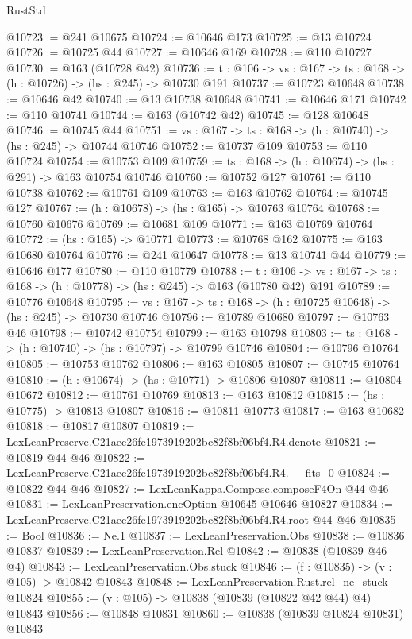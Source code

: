\begin{lexlean}{RustStd}
\begin{coremodule}
@10723 := @241 @10675
@10724 := @10646 @173
@10725 := @13 @10724
@10726 := @10725 @44
@10727 := @10646 @169
@10728 := @110 @10727
@10730 := @163 (@10728 @42)
@10736 := {t : @106} -> {vs : @167} -> {ts : @168} -> (h : @10726) -> (hs : @245) -> @10730 @191
@10737 := @10723 @10648
@10738 := @10646 @42
@10740 := @13 @10738 @10648
@10741 := @10646 @171
@10742 := @110 @10741
@10744 := @163 (@10742 @42)
@10745 := @128 @10648
@10746 := @10745 @44
@10751 := {vs : @167} -> {ts : @168} -> (h : @10740) -> (hs : @245) -> @10744 @10746
@10752 := @10737 @109
@10753 := @110 @10724
@10754 := @10753 @109
@10759 := {ts : @168} -> (h : @10674) -> (hs : @291) -> @163 @10754 @10746
@10760 := @10752 @127
@10761 := @110 @10738
@10762 := @10761 @109
@10763 := @163 @10762
@10764 := @10745 @127
@10767 := (h : @10678) -> (hs : @165) -> @10763 @10764
@10768 := @10760 @10676
@10769 := @10681 @109
@10771 := @163 @10769 @10764
@10772 := (hs : @165) -> @10771
@10773 := @10768 @162
@10775 := @163 @10680 @10764
@10776 := @241 @10647
@10778 := @13 @10741 @44
@10779 := @10646 @177
@10780 := @110 @10779
@10788 := {t : @106} ->
  {vs : @167} -> {ts : @168} -> (h : @10778) -> (hs : @245) -> @163 (@10780 @42) @191
@10789 := @10776 @10648
@10795 := {vs : @167} -> {ts : @168} -> (h : @10725 @10648) -> (hs : @245) -> @10730 @10746
@10796 := @10789 @10680
@10797 := @10763 @46
@10798 := @10742 @10754
@10799 := @163 @10798
@10803 := {ts : @168} -> (h : @10740) -> (hs : @10797) -> @10799 @10746
@10804 := @10796 @10764
@10805 := @10753 @10762
@10806 := @163 @10805
@10807 := @10745 @10764
@10810 := (h : @10674) -> (hs : @10771) -> @10806 @10807
@10811 := @10804 @10672
@10812 := @10761 @10769
@10813 := @163 @10812
@10815 := (hs : @10775) -> @10813 @10807
@10816 := @10811 @10773
@10817 := @163 @10682
@10818 := @10817 @10807
@10819 := LexLeanPreserve.C21aec26fe1973919202bc82f8bf06bf4.R4.denote
@10821 := @10819 @44 @46
@10822 := LexLeanPreserve.C21aec26fe1973919202bc82f8bf06bf4.R4.__fits_0
@10824 := @10822 @44 @46
@10827 := LexLeanKappa.Compose.composeF4On @44 @46
@10831 := LexLeanPreservation.encOption @10645 @10646 @10827
@10834 := LexLeanPreserve.C21aec26fe1973919202bc82f8bf06bf4.R4.root @44 @46
@10835 := Bool
@10836 := Ne.{1}
@10837 := LexLeanPreservation.Obs
@10838 := @10836 @10837
@10839 := LexLeanPreservation.Rel
@10842 := @10838 (@10839 @46 @4)
@10843 := LexLeanPreservation.Obs.stuck
@10846 := (f : @10835) -> (v : @105) -> @10842 @10843
@10848 := LexLeanPreservation.Rust.rel_ne_stuck @10824
@10855 := (v : @105) -> @10838 (@10839 (@10822 @42 @44) @4) @10843
@10856 := @10848 @10831
@10860 := @10838 (@10839 @10824 @10831) @10843

\end{coremodule}
\end{lexlean}
